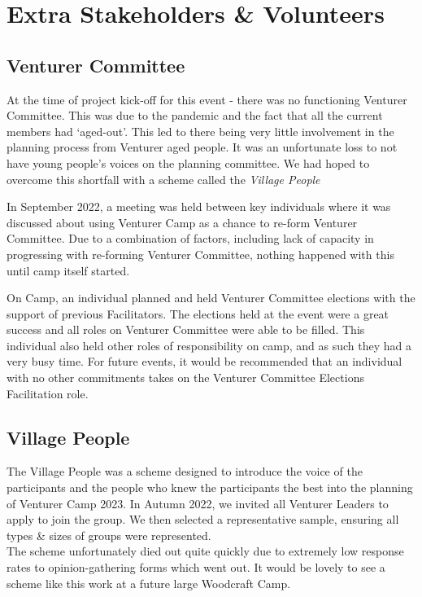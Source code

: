 \chapter{Extra Stakeholders \&  Volunteers}
\section{Venturer Committee}
At the time of project kick-off for this event - there was no functioning Venturer Committee. This was due to the pandemic and the fact that all the current members had `aged-out'. This led to there being very little involvement in the planning process from Venturer aged people. It was an unfortunate loss to not have young people's voices on the planning committee. We had hoped to overcome this shortfall with a scheme called the \textit{Village People}

In September 2022, a meeting was held between key individuals where it was discussed about using Venturer Camp as a chance to re-form Venturer Committee. Due to a combination of factors, including lack of capacity in progressing with re-forming Venturer Committee, nothing happened with this until camp itself started.

On Camp, an individual planned and held Venturer Committee elections with the support of previous Facilitators. The elections held at the event were a great success and all roles on Venturer Committee were able to be filled. This individual also held other roles of responsibility on camp, and as such they had a very busy time. For future events, it would be recommended that an individual with no other commitments takes on the Venturer Committee Elections Facilitation role.

\section{Village People}
The Village People was a scheme designed to introduce the voice of the participants and the people who knew the participants the best into the planning of Venturer Camp 2023. In Autumn 2022, we invited all Venturer Leaders to apply to join the group. We then selected a representative sample, ensuring all types \& sizes of groups were represented.\\

The scheme unfortunately died out quite quickly due to extremely low response rates to opinion-gathering forms which went out. It would be lovely to see a scheme like this work at a future large Woodcraft Camp. 

